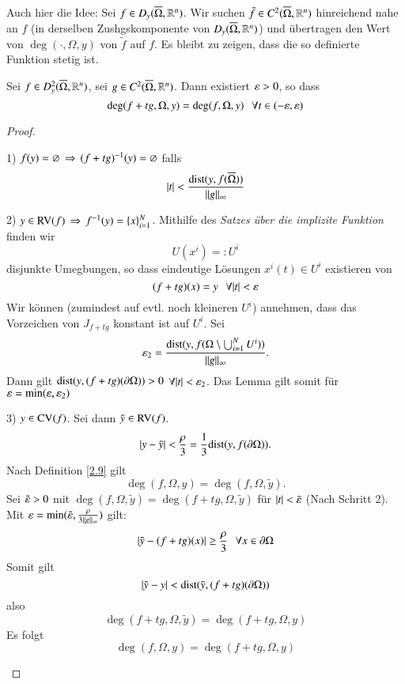 Auch hier die Idee: Sei $f\in D_y(\overline \Omega, \mathbb{R}^n)$. Wir suchen $\tilde f \in C^2 (\overline \Omega, \mathbb{R}^n)$
hinreichend nahe an $f$ (in derselben Zushgskomponente von $D_y(\overline \Omega, \mathbb{R}^n)$) und übertragen
den Wert von $\deg(\cdot , \Omega, y)$ von $\tilde f$ auf $f$. Es bleibt zu zeigen, dass die so
definierte Funktion stetig ist.

\begin{lem}\label{2.10}
    Sei $f\in D_y^2(\overline \Omega, \mathbb{R}^n)$, sei $g\in C^2(\overline \Omega, \mathbb{R}^n)$. Dann existiert $\varepsilon >0$, so 
    dass
    \[
        \deg (f+tg,\Omega,y)= \deg(f,\Omega,y) \hspace{.25cm} \forall t\in (-\varepsilon,\varepsilon)
    \]
\end{lem}
\begin{proof}
    \begin{description}
        \item{1)}
        $f(y)=\varnothing \, \Rightarrow \, (f+tg)^{-1}(y)=\varnothing$ falls
        \[
            |t| < \frac{\mathrm{dist}(y,f(\overline \Omega))}{\|g\|_\infty}
        \]
        \item{2)}
        $y\in \mathrm{RV} (f) \, \Rightarrow \, f^{-1}(y)=\{x\}_{i=1}^N$. Mithilfe des \textit{Satzes über die 
            implizite Funktion} finden wir
            \[
                U(x^i)=:U^i
            \]
            disjunkte Umegbungen, so dass eindeutige Lösungen $x^i(t)\in U^i$ existieren von
            \[
                (f+tg)(x)=y \hspace{.25cm} \forall |t|<\varepsilon
            \]
            Wir können (zumindest auf evtl. noch kleineren $U^i$) annehmen, dass das Vorzeichen
            von $J_{f+tg}$ konstant ist auf $U^i$. Sei 
            \[
                \varepsilon _2= \frac{\mathrm{dist}(y,f(\Omega\setminus \bigcup_{i=1}^NU^i))}{\|g\|_\infty}.
            \]
            Dann gilt $\mathrm{dist}(y,(f+tg)(\partial \Omega))>0$ $\forall |t|<\varepsilon_2$. Das Lemma gilt somit
            für $\varepsilon = \min(\varepsilon,\varepsilon_2)$
        \item{3)}
            $y\in \mathrm{CV}(f)$. Sei dann $\tilde y\in \mathrm{RV}(f)$.
            \[
                |y-\tilde y|< \frac{\rho}{3} = \frac13 \mathrm{dist}(y,f(\partial \Omega)).
            \]
            Nach Definition \ref{2.9} gilt
            \[
                \deg (f,\Omega,y)=\deg(f,\Omega,\tilde y).
            \]
            Sei $\tilde {\varepsilon}>0$ mit $\deg(f,\Omega,\tilde y)=\deg(f+tg,\Omega,\tilde y)$ für $|t|<\tilde
            {\varepsilon}$ (Nach Schritt 2).
            Mit $\varepsilon=\min(\tilde {\varepsilon} , \frac{\rho}{3\|g\|_\infty})$ gilt:
            \[
                |\tilde y-(f+tg)(x)|\geq \frac{\rho}{3} \hspace{.25cm} \forall x \in \partial \Omega
            \]
            Somit gilt
            \[
                |\tilde y-y|< \mathrm{dist} (\tilde y, (f+tg)(\partial \Omega))
            \]
            also
            \[
                \deg(f+tg,\Omega,\tilde y)= \deg (f+tg,\Omega,y)
            \]
            Es folgt
            \[
                \deg(f,\Omega, y)= \deg(f+tg,\Omega,y)
            \]
    \end{description}
    \[ \]
\end{proof}

